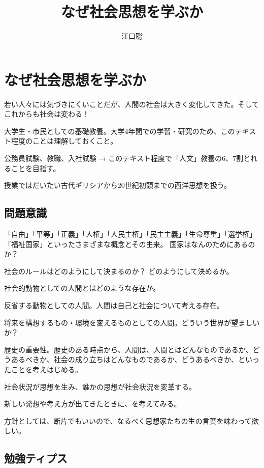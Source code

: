 \documentclass[uplatex,dvipdfmx]{jsarticle}
\author{江口聡}
\title{なぜ社会思想を学ぶか}
\begin{document}
\maketitle

\else

\chapter{なぜ社会思想を学ぶか}

\fi


若い人々には気づきにくいことだが、人間の社会は大きく変化してきた。そしてこれからも社会は変わる！

大学生・市民としての基礎教養。大学4年間での学習・研究のため、このテキスト程度のことは理解しておくこと。

公務員試験、教職、入社試験 → このテキスト程度で「人文」教養の6、7割とれることを目指す。

授業ではだいたい古代ギリシアから20世紀初頭までの西洋思想を扱う。


\section{問題意識}


「自由」「平等」「正義」「人権」「人民主権」「民主主義」「生命尊重」「選挙権」「福祉国家」といったさまざまな概念とその由来。
国家はなんのためにあるのか？

社会のルールはどのようにして決まるのか？ どのようにして決めるか。

社会的動物としての人間とはどのような存在か。

反省する動物としての人間。人間は自己と社会について考える存在。

将来を構想するもの・環境を変えるものとしての人間。どういう世界が望ましいか？

  歴史の重要性。歴史のある時点から、人間は、人間とはどんなものであるか、どうあるべきか、社会の成り立ちはどんなものであるか、どうあるべきか、といったことを考えはじめる。

  社会状況が思想を生み、誰かの思想が社会状況を変革する。

  新しい発想や考え方が出てきたときに、を考えてみる。

方針としては、断片でもいいので、なるべく思想家たちの生の言葉を味わって欲しい。




\section*{勉強ティプス}
\end{document}
